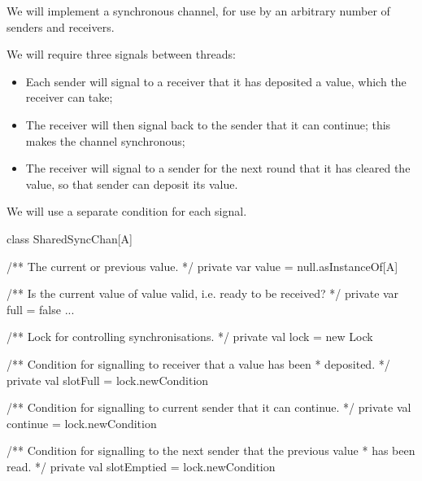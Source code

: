 \begin{slide}

We will implement a synchronous channel, for use by an arbitrary number of
senders and receivers.  

We will require three signals between threads:
%
\begin{itemize}
\item Each sender will signal to a receiver that it has deposited a value,
  which the receiver can take;

\item The receiver will then signal back to the sender that it can continue;
  this makes the channel synchronous;

\item The receiver will signal to a sender for the next round that it has
  cleared the value, so that sender can deposit its value.
\end{itemize}
%
We will use a separate condition for each signal. 
\end{slide}


\begin{slide}

\begin{scala}
class SharedSyncChan[A]{
  /** The current or previous value. */
  private var value = null.asInstanceOf[A]

  /** Is the current value of value valid, i.e. ready to be received? */
  private var full = false
  ...
}
\end{scala}
\end{slide}


\begin{slide}

\begin{scala}
  /** Lock for controlling synchronisations. */
  private val lock = new Lock

  /** Condition for signalling to receiver that a value has been 
    * deposited. */
  private val slotFull = lock.newCondition

  /** Condition for signalling to current sender that it can continue. */
  private val continue = lock.newCondition

  /** Condition for signalling to the next sender that the previous value 
    * has been read. */
  private val slotEmptied = lock.newCondition
\end{scala}
\end{slide}


